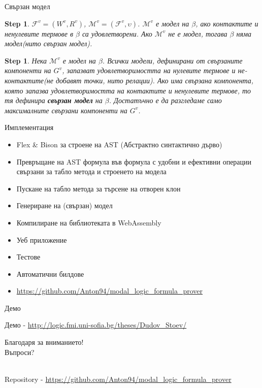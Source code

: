 \documentclass[14pt, aspectratio=169]{beamer}
\newtheorem{step}[theorem]{Step}
\newcommand\M{\mathcal{M}}
\newcommand\F{\mathcal{F}}
\begin{document}
\begin{frame}{Свързан модел}
	\small
	\begin{step}
		$\F^v = (W^v, R^v)$, $\M^v = (\F^v, \upsilon)$. $\M^v$ е модел на $\beta$, ако контактите и ненулевите термове в $\beta$ са удовлетворени. Ако $\M^v$ не е модел, тогава $\beta$ няма модел(нито свързан модел).
	\end{step}

	\begin{step}
		Нека $\M^v$ е модел на $\beta$. Всички модели, дефинирани от свързаните компоненти на $G^v$, запазват удовлетворимостта на нулевите термове и не-контактите(не добавят точки, нито релации). Ако има свързана компонента, която запазва удовлетворимостта на контактите и ненулевите термове, то тя дефинира \textbf{свързан модел} на $\beta$. Достатъчно е да разгледаме само максималните свързани компоненти на $G^v$.
	\end{step}
\end{frame}

\begin{frame}{Имплементация}
	\begin{itemize}
		\item Flex \& Bison за строене на AST (Абстрактно синтактично дърво)
		\item Превръщане на AST формула във формула с удобни и ефективни операции свързани за табло метода и строенето на модела
		\item Пускане на табло метода за търсене на отворен клон
		\item Генериране на (свързан) модел
		\item Компилиране на библиотеката в WebAssembly
		\item Уеб приложение
		\item Тестове
		\item Автоматични билдове
		\item \url{https://github.com/Anton94/modal_logic_formula_prover}
	\end{itemize}
\end{frame}

\begin{frame}{Демо}
	\begin{center}
		Демо - \url{http://logic.fmi.uni-sofia.bg/theses/Dudov_Stoev/}
	\end{center}
\end{frame}

\begin{frame}
	\begin{center}
		\Huge
		Благодаря за вниманието!
		\\ [12mm]
		Въпроси?
	\end{center}

    \mbox{}
    \\ [20mm]
	\small
	Repository - \url{https://github.com/Anton94/modal_logic_formula_prover}
\end{frame}
\end{document}

